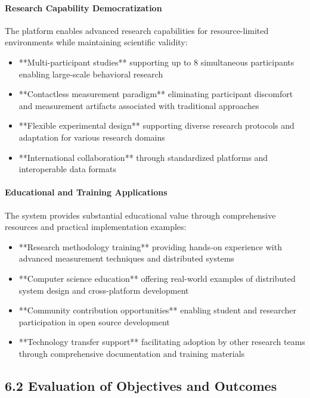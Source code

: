 \documentclass[12pt,a4paper]{article}
\begin{document}
\paragraph{Research Capability Democratization}

The platform enables advanced research capabilities for resource-limited environments while maintaining scientific
validity:

\begin{itemize}
\item **Multi-participant studies** supporting up to 8 simultaneous participants enabling large-scale behavioral research
\item **Contactless measurement paradigm** eliminating participant discomfort and measurement artifacts associated with
  traditional approaches
\item **Flexible experimental design** supporting diverse research protocols and adaptation for various research domains
\item **International collaboration** through standardized platforms and interoperable data formats

\end{itemize}
\paragraph{Educational and Training Applications}

The system provides substantial educational value through comprehensive resources and practical implementation examples:

\begin{itemize}
\item **Research methodology training** providing hands-on experience with advanced measurement techniques and distributed
  systems
\item **Computer science education** offering real-world examples of distributed system design and cross-platform
  development
\item **Community contribution opportunities** enabling student and researcher participation in open source development
\item **Technology transfer support** facilitating adoption by other research teams through comprehensive documentation and
  training materials

\end{itemize}
\subsection{6.2 Evaluation of Objectives and Outcomes}
\end{document}
